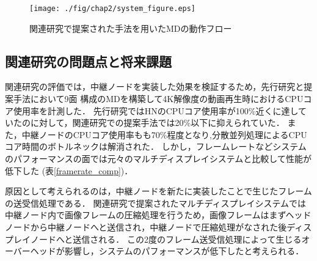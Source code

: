 \begin{figure}[H]
  \hspace*{\fill}
  \texttt{[image: ./fig/chap2/system\_figure.eps]}
  \hspace*{\fill}
  \caption{関連研究で提案された手法を用いたMDの動作フロー}
  \label{middle_mdflow}
 \end{figure}

 \subsection*{関連研究の問題点と将来課題}
関連研究の評価では，中継ノードを実装した効果を検証するため，先行研究と提案手法において9面
構成のMDを構築して4K解像度の動画再生時におけるCPUコア使用率を計測した．
先行研究ではHNのCPUコア使用率が100\%近くに達していたのに対して，関連研究での提案手法では20\%以下に抑えられていた．
また，中継ノードのCPUコア使用率もも70\%程度となり,分散並列処理によるCPUコア時間のボトルネックは解消された．
しかし，フレームレートなどシステムのパフォーマンスの面では元々のマルチディスプレイシステムと比較して性能が低下した (表\ref{framerate_comp})．

 \begin{table}[H]
  \centering
  \caption{中継ノード実装によるフレームレートの比較}\label{tab1}
  \end{table}

 原因として考えられるのは，中継ノードを新たに実装したことで生じたフレームの送受信処理である．
 関連研究で提案されたマルチディスプレイシステムでは中継ノード内で画像フレームの圧縮処理を行うため，画像フレームはまずヘッドノードから中継ノードへと送信され，中継ノードで圧縮処理がなされた後ディスプレイノードへと送信される．
 この2度のフレーム送受信処理によって生じるオーバーヘッドが影響し，システムのパフォーマンスが低下したと考えられる．

